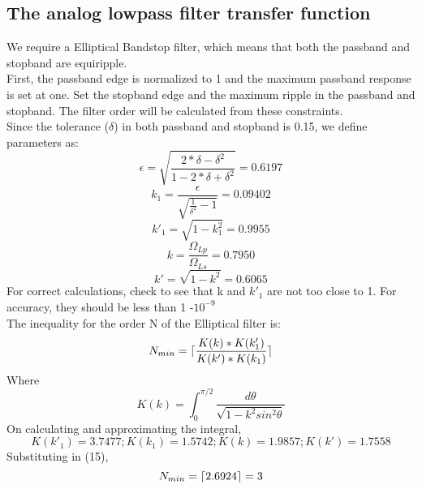 \documentclass[12pt]{article}
\DeclarePairedDelimiter\ceil{\lceil}{\rceil}
\begin{document}
\subsection{The analog lowpass filter transfer function}
We require a Elliptical Bandstop filter, which means that both the passband and stopband are equiripple.
\\First, the passband edge is normalized to 1 and the maximum passband response is set at one. Set the
stopband edge and the maximum ripple in the passband and stopband. The filter order will be calculated from
these constraints.
\\Since the tolerance ($\delta$) in both passband and stopband is 0.15, we define parameters as:
\begin{equation}
    \epsilon = \sqrt{\frac{2*\delta-\delta^2}{1-2*\delta+\delta^2}} = 0.6197
\end{equation}
\begin{equation}
    k_1=\frac{\epsilon}{\sqrt{\frac{1}{\delta^2}-1}}=0.09402
\end{equation}
\begin{equation}
    k'_1=\sqrt{1-k_1^2}=0.9955
\end{equation}
\begin{equation}
    k=\frac{\Omega_{Lp}}{\Omega_{Ls}}=0.7950
\end{equation}
\begin{equation}
    k'=\sqrt{1-k^2}=0.6065
\end{equation}
For correct calculations, check to see that k and $k'_1$ are not too close to 1. For accuracy, they should be less
than 1 -$ 10^{-9}$
\\The inequality for the order N of the Elliptical filter is:
\begin{equation}
    N_{min}=\ceil{\frac{K(k)*K(k'_1)}{K(k')*K(k_1)}} 
\end{equation}
Where 
\begin{equation}
    K(k)=\int^{\pi/2}_0 \frac{d\theta}{\sqrt{1-k^2sin^2\theta}}
\end{equation}
On calculating and approximating the integral,
\begin{equation}
    K(k'_1)=3.7477;  K(k_1)=1.5742; K(k)=1.9857; K(k')=1.7558
\end{equation}
Substituting in (15),
\begin{equation}
    N_{min}=\ceil{2.6924}=3
\end{equation}
\end{document}
